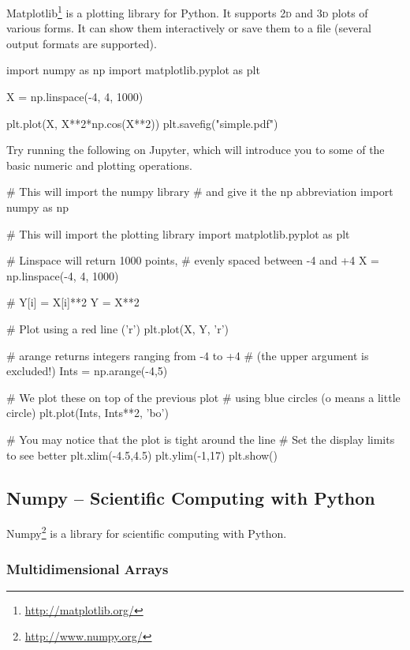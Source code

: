Matplotlib\footnote{\url{http://matplotlib.org/}} is a plotting library for Python. It supports \textsc{2d} and \textsc{3d} plots of various forms. It can show them interactively or save them to a file (several output formats are supported).

\begin{python}
import numpy as np
import matplotlib.pyplot as plt

X = np.linspace(-4, 4, 1000)

plt.plot(X, X**2*np.cos(X**2))
plt.savefig("simple.pdf")
\end{python}

\begin{exercise}
Try running the following on Jupyter, which will introduce you to some of the basic numeric and plotting operations.

\begin{python}
# This will import the numpy library
# and give it the np abbreviation
import numpy as np

# This will import the plotting library
import matplotlib.pyplot as plt

# Linspace will return 1000 points,
# evenly spaced between -4 and +4
X = np.linspace(-4, 4, 1000)

# Y[i] = X[i]**2
Y = X**2

# Plot using a red line ('r')
plt.plot(X, Y, 'r')

# arange returns integers ranging from -4 to +4
# (the upper argument is excluded!)
Ints = np.arange(-4,5)

# We plot these on top of the previous plot
# using blue circles (o means a little circle)
plt.plot(Ints, Ints**2, 'bo')

# You may notice that the plot is tight around the line
# Set the display limits to see better
plt.xlim(-4.5,4.5)
plt.ylim(-1,17)
plt.show()
\end{python}
\end{exercise}

\subsection{Numpy -- Scientific Computing with Python}

Numpy\footnote{\url{http://www.numpy.org/}} is a library for scientific computing with Python.

\subsubsection{Multidimensional Arrays}


